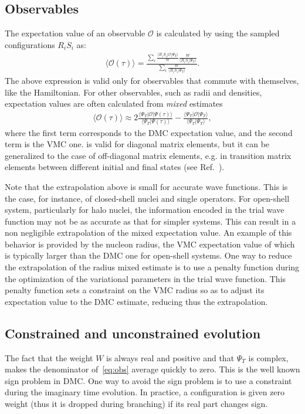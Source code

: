 \documentclass[aps,prc,twocolumn,superscriptaddress,floatfix]{revtex4-1}
\begin{document}
\subsection{Observables}
\label{sec:obs}
The expectation value of an observable $\mathcal O$ is calculated by using the sampled configurations $R_iS_i$ as:
\begin{align}
\displaystyle\langle \mathcal O(\tau)\rangle=\frac{\displaystyle\sum_i \frac{\langle R_iS_i|\mathcal O|\Psi_T\rangle}{W}\frac{W}{\langle R_iS_i|\Psi_T\rangle}}
{\displaystyle\sum_i\frac{W}{\langle R_iS_i|\Psi_T\rangle}}.
\label{eq:obs}
\end{align}
The above expression is valid only for observables that commute with themselves, like the Hamiltonian.
For other observables, such as radii and densities, expectation values are often calculated from \emph{mixed} estimates 
\begin{align}
\langle\mathcal O(\tau)\rangle\approx2\frac{\langle\Psi_T|\mathcal O|\Psi(\tau)\rangle}{\langle\Psi_T|\Psi(\tau)\rangle}
-\frac{\langle\Psi_T|\mathcal O|\Psi_T\rangle}{\langle\Psi_T|\Psi_T\rangle}	,
\label{eq:mix}
\end{align}
where the first term corresponds to the DMC expectation value, and the second term is the VMC one.
 is valid for diagonal matrix elements, but it can be generalized to the case of off-diagonal matrix 
elements, e.g. in transition matrix elements between different initial and final states
(see Ref.~\cite{Pervin:2007}). 

Note that the extrapolation above is small for accurate wave functions.
This is the case, for instance, of closed-shell nuclei and single operators.
For open-shell system, particularly for halo nuclei, the information encoded in the trial
wave function may not be as accurate as that for simpler systems. This can result in
a non negligible extrapolation of the mixed expectation value.
An example of this behavior is provided by the nucleon radius, 
the VMC expectation value of which is typically larger than the DMC one
for open-shell systems. One way to reduce the extrapolation of the radius mixed estimate
is to use a penalty function during the optimization of the variational parameters 
in the trial wave function. This penalty function sets a constraint on the VMC radius so as to
adjust its expectation value to the DMC estimate, reducing thus the extrapolation.


\subsection{Constrained and unconstrained evolution}
\label{sec:cp}
The fact that the weight $W$ is always real and positive and that $\Psi_T$ is complex, 
makes the denominator of~\cref{eq:obs} average quickly to zero. 
This is the well known sign problem in DMC.
One way to avoid the sign problem is to use a constraint during the imaginary time evolution. 
In practice, a configuration is given zero weight (thus it is dropped during branching) 
if its real part changes sign.
\end{document}
